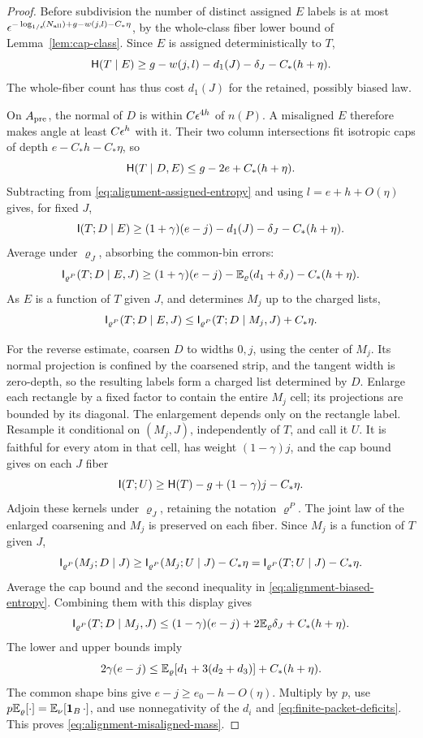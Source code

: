 \begin{proof}
Before subdivision the number of distinct assigned \(E\) labels
is at most
\(\epsilon^{-\log_{1/\epsilon}\!\left(N_{\rm all}\right)+g-w(j,l)-C_*\eta}\), by the
whole-class fiber lower bound of Lemma~\ref{lem:cap-class}.
Since \(E\) is assigned deterministically to \(T\),
\begin{equation}
 \mathsf H(T\mid E)\ge
 g-w(j,l)-d_1(J)-\delta_J-C_*(h+\eta).
 \label{eq:alignment-assigned-entropy}
\end{equation}
The whole-fiber count has thus cost \(d_1(J)\) for the retained,
possibly biased law.

On \(A_{\rm pre}\), the normal of \(D\) is within \(C\epsilon^{4h}\)
of \(n(P)\).  A misaligned \(E\) therefore makes angle at least
\(C\epsilon^h\) with it.  Their two column intersections fit isotropic
caps of depth \(e-C_*h-C_*\eta\), so
\[
 \mathsf H(T\mid D,E)\le g-2e+C_*(h+\eta).
\]
Subtracting from \eqref{eq:alignment-assigned-entropy} and using
\(l=e+h+O(\eta)\) gives, for fixed \(J\),
\[
 \mathsf I(T;D\mid E)\ge
 (1+\gamma)(e-j)-d_1(J)-\delta_J-C_*(h+\eta).
\]
Average under \(\varrho_J\), absorbing the common-bin errors:
\begin{equation}
 \mathsf I_{\varrho^P}(T;D\mid E,J)\ge
 (1+\gamma)(e-j)-\mathbb E_\varrho(d_1+\delta_J)-C_*(h+\eta).
 \label{eq:alignment-information-lower}
\end{equation}
As \(E\) is a function of \(T\) given \(J\), and determines \(M_j\) up to
the charged lists,
\[
 \mathsf I_{\varrho^P}(T;D\mid E,J)
 \le \mathsf I_{\varrho^P}(T;D\mid M_j,J)+C_*\eta.
\]

For the reverse estimate, coarsen \(D\) to widths \(0,j\), using
the center of \(M_j\).  Its normal projection is confined by the
coarsened strip, and the tangent width is zero-depth, so the
resulting labels form a charged list determined by \(D\).
Enlarge each rectangle by a fixed factor to contain the entire
\(M_j\) cell; its projections are bounded by its diagonal.
The enlargement depends only on the rectangle label.  Resample it
conditional on \((M_j,J)\), independently of \(T\), and call it
\(U\).  It is faithful for every atom in that cell, has weight
\((1-\gamma)j\), and the cap bound gives on each \(J\) fiber
\[
 \mathsf I(T;U)\ge \mathsf H(T)-g+(1-\gamma)j-C_*\eta.
\]
Adjoin these kernels under \(\varrho_J\), retaining the notation
\(\varrho^P\).  The joint law of the enlarged coarsening and \(M_j\) is
preserved on each fiber.  Since \(M_j\) is a function of \(T\) given \(J\),
\[
 \mathsf I_{\varrho^P}(M_j;D\mid J)
 \ge \mathsf I_{\varrho^P}(M_j;U\mid J)-C_*\eta
 =\mathsf I_{\varrho^P}(T;U\mid J)-C_*\eta.
\]
Average the cap bound and the second inequality in
\eqref{eq:alignment-biased-entropy}.  Combining them with this
display gives
\begin{equation}
 \mathsf I_{\varrho^P}(T;D\mid M_j,J)\le
 (1-\gamma)(e-j)+2\mathbb E_\varrho\delta_J+C_*(h+\eta).
 \label{eq:alignment-information-upper}
\end{equation}
The lower and upper bounds imply
\[
 2\gamma(e-j)\le
 \mathbb E_\varrho[d_1+3(d_2+d_3)]+C_*(h+\eta).
\]
The common shape bins give \(e-j\ge e_0-h-O(\eta)\).
Multiply by \(p\), use
\(p\mathbb E_\varrho[\cdot]=\mathbb E_\nu[\boldsymbol1_B\,\cdot]\), and use nonnegativity
of the \(d_i\) and \eqref{eq:finite-packet-deficits}.  This proves
\eqref{eq:alignment-misaligned-mass}.
\end{proof}

